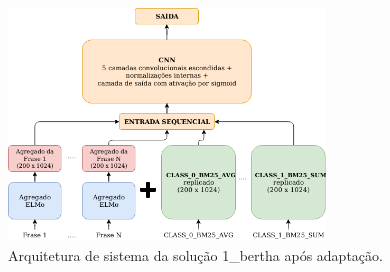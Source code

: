 \begin{figure}[h]
    \centering
    \caption{Arquitetura de sistema da solução 1\_bertha após adaptação.}
    \begin{center}
        \includegraphics[width=0.75\textwidth]{img/1-bertha-arquitetura-com-ri.png}
    \end{center}
    \vspace{-0.5cm}
    \label{fig:1-bertha-arquitetura-com-ri}
\end{figure}